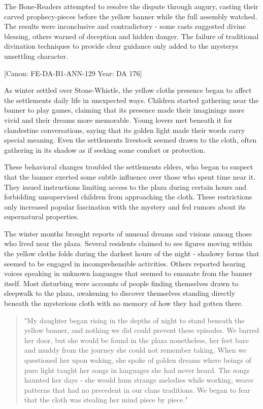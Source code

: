 The Bone-Readers attempted to resolve the dispute through augury,
casting their carved prophecy-pieces before the yellow banner while the
full assembly watched. The results were inconclusive and contradictory -
some casts suggested divine blessing, others warned of deception and
hidden danger. The failure of traditional divination techniques to
provide clear guidance only added to the mystery\textquotesingle s
unsettling character.

{[}Canon: FE-DA-B1-ANN-129 \textbar{} Year: DA 176{]}

As winter settled over Stone-Whistle, the yellow cloth\textquotesingle s
presence began to affect the settlement\textquotesingle s daily life in
unexpected ways. Children started gathering near the banner to play
games, claiming that its presence made their imaginings more vivid and
their dreams more memorable. Young lovers met beneath it for clandestine
conversations, saying that its golden light made their words carry
special meaning. Even the settlement\textquotesingle s livestock seemed
drawn to the cloth, often gathering in its shadow as if seeking some
comfort or protection.

These behavioral changes troubled the settlement\textquotesingle s
elders, who began to suspect that the banner exerted some subtle
influence over those who spent time near it. They issued instructions
limiting access to the plaza during certain hours and forbidding
unsupervised children from approaching the cloth. These restrictions
only increased popular fascination with the mystery and fed rumors about
its supernatural properties.

The winter months brought reports of unusual dreams and visions among
those who lived near the plaza. Several residents claimed to see figures
moving within the yellow cloth\textquotesingle s folds during the
darkest hours of the night - shadowy forms that seemed to be engaged in
incomprehensible activities. Others reported hearing voices speaking in
unknown languages that seemed to emanate from the banner itself. Most
disturbing were accounts of people finding themselves drawn to sleepwalk
to the plaza, awakening to discover themselves standing directly beneath
the mysterious cloth with no memory of how they had gotten there.

\begin{quote}
"My daughter began rising in the depths of night to stand beneath the
yellow banner, and nothing we did could prevent these episodes. We
barred her door, but she would be found in the plaza nonetheless, her
feet bare and muddy from the journey she could not remember taking. When
we questioned her upon waking, she spoke of golden dreams where beings
of pure light taught her songs in languages she had never heard. The
songs haunted her days - she would hum strange melodies while working,
weave patterns that had no precedent in our clan\textquotesingle s
traditions. We began to fear that the cloth was stealing her mind piece
by piece."
\end{quote}

